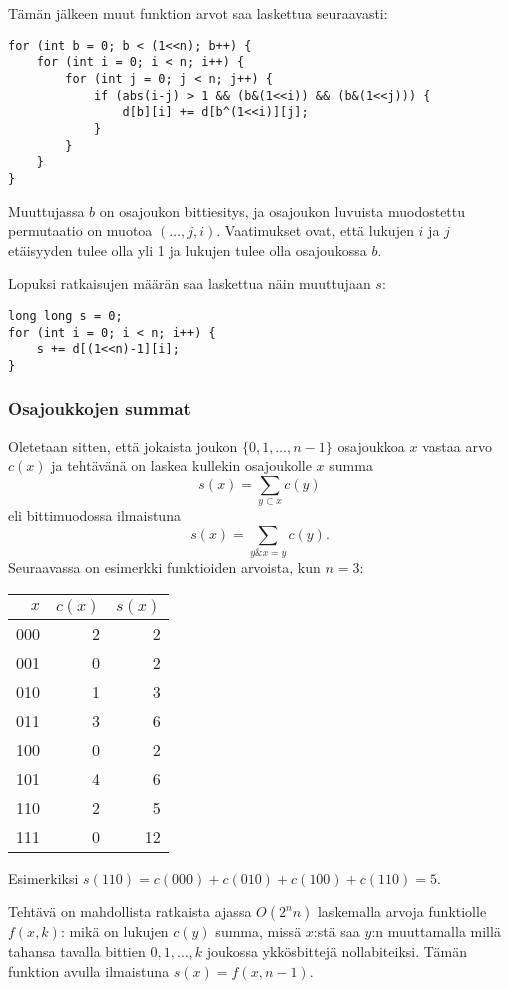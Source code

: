 \noindent
Tämän jälkeen muut funktion arvot
saa laskettua seuraavasti:

\begin{lstlisting}
for (int b = 0; b < (1<<n); b++) {
    for (int i = 0; i < n; i++) {
        for (int j = 0; j < n; j++) {
            if (abs(i-j) > 1 && (b&(1<<i)) && (b&(1<<j))) {
                d[b][i] += d[b^(1<<i)][j];
            }
        }
    }
}
\end{lstlisting}

\noindent
Muuttujassa $b$ on osajoukon bittiesitys,
ja osajoukon luvuista muodostettu
permutaatio on muotoa $(\ldots,j,i)$.
Vaatimukset ovat, että lukujen $i$ ja $j$
etäisyyden tulee olla yli 1
ja lukujen tulee olla osajoukossa $b$.

Lopuksi ratkaisujen määrän saa laskettua näin
muuttujaan $s$:

\begin{lstlisting}
long long s = 0;
for (int i = 0; i < n; i++) {
    s += d[(1<<n)-1][i];
}
\end{lstlisting}

\subsubsection{Osajoukkojen summat}

Oletetaan sitten, että jokaista
joukon $\{0,1,\ldots,n-1\}$
osajoukkoa $x$ vastaa arvo $c(x)$ ja
tehtävänä on laskea kullekin
osajoukolle $x$ summa
\[s(x)=\sum_{y \subset x} c(y) \]
eli bittimuodossa ilmaistuna
\[s(x)=\sum_{y \& x = y} c(y). \]
Seuraavassa on esimerkki funktioiden arvoista,
kun $n=3$:
\begin{center}
\begin{tabular}{rrr}
$x$ & $c(x)$ & $s(x)$ \\
\hline
000 & 2 & 2 \\
001 & 0 & 2 \\
010 & 1 & 3 \\
011 & 3 & 6 \\
100 & 0 & 2 \\
101 & 4 & 6 \\
110 & 2 & 5 \\
111 & 0 & 12 \\
\end{tabular}
\end{center}
Esimerkiksi $s(110)=c(000)+c(010)+c(100)+c(110)=5$. 

Tehtävä on mahdollista ratkaista ajassa $O(2^n n)$
laskemalla arvoja funktiolle $f(x,k)$:
mikä on lukujen $c(y)$ summa, missä $x$:stä saa $y$:n
muuttamalla millä tahansa tavalla bittien $0,1,\ldots,k$
joukossa ykkösbittejä nollabiteiksi.
Tämän funktion avulla ilmaistuna $s(x)=f(x,n-1)$.

